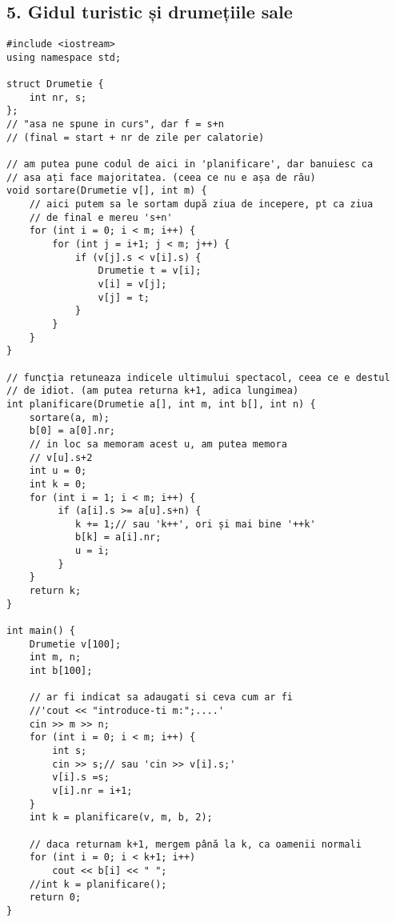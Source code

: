 \documentclass[11pt]{article}
\begin{document}
\subsection*{5. Gidul turistic și drumețiile sale}
\label{sec:org0f029d2}
\begin{verbatim}
#include <iostream>
using namespace std;

struct Drumetie {
    int nr, s;
};
// "asa ne spune in curs", dar f = s+n
// (final = start + nr de zile per calatorie)

// am putea pune codul de aici in 'planificare', dar banuiesc ca
// asa ați face majoritatea. (ceea ce nu e așa de rău)
void sortare(Drumetie v[], int m) {
    // aici putem sa le sortam după ziua de incepere, pt ca ziua
    // de final e mereu 's+n'
    for (int i = 0; i < m; i++) {
        for (int j = i+1; j < m; j++) {
            if (v[j].s < v[i].s) {
                Drumetie t = v[i];
                v[i] = v[j];
                v[j] = t;
            }
        }
    }
}

// funcția retuneaza indicele ultimului spectacol, ceea ce e destul
// de idiot. (am putea returna k+1, adica lungimea)
int planificare(Drumetie a[], int m, int b[], int n) {
    sortare(a, m);
    b[0] = a[0].nr;
    // in loc sa memoram acest u, am putea memora
    // v[u].s+2
    int u = 0;
    int k = 0;
    for (int i = 1; i < m; i++) {
         if (a[i].s >= a[u].s+n) {
            k += 1;// sau 'k++', ori și mai bine '++k'
            b[k] = a[i].nr;
            u = i;
         }
    }
    return k;
}

int main() {
    Drumetie v[100];
    int m, n;
    int b[100];

    // ar fi indicat sa adaugati si ceva cum ar fi
    //'cout << "introduce-ti m:";....'
    cin >> m >> n;
    for (int i = 0; i < m; i++) {
        int s;
        cin >> s;// sau 'cin >> v[i].s;'
        v[i].s =s;
        v[i].nr = i+1;
    }
    int k = planificare(v, m, b, 2);

    // daca returnam k+1, mergem până la k, ca oamenii normali
    for (int i = 0; i < k+1; i++)
        cout << b[i] << " ";
    //int k = planificare();
    return 0;
}

\end{verbatim}
\end{document}
